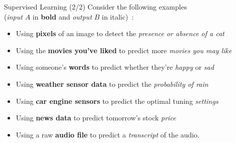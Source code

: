 \documentclass[pdf]{beamer}
\theoremstyle{mystyle}
\begin{document}
\begin{frame}{Supervised Learning (2/2)}
	Consider the following examples \\
	(\textit{input} $A$ in \textbf{bold} and \textit{output} $B$ in italic)~\citep{trask2019grokking}:
	\begin{itemize}
		\item<2-> Using \textbf{pixels} of an image to detect the \textit{presence or absence of a cat}
		\item<3-> Using the \textbf{movies you've liked} to predict more \textit{movies you may like}
		\item<4-> Using someone's \textbf{words} to predict whether they're \textit{happy} or \textit{sad} 
		\item<5-> Using \textbf{weather sensor data} to predict the \textit{probability of rain}
		\item<6-> Using \textbf{car engine sensors} to predict the optimal tuning \textit{settings}
		\item<7-> Using \textbf{news data} to predict tomorrow's stock \textit{price}
		\item<8-> Using a raw \textbf{audio file} to predict a \textit{transcript} of the audio.
	\end{itemize}	
\end{frame}
\end{document}
